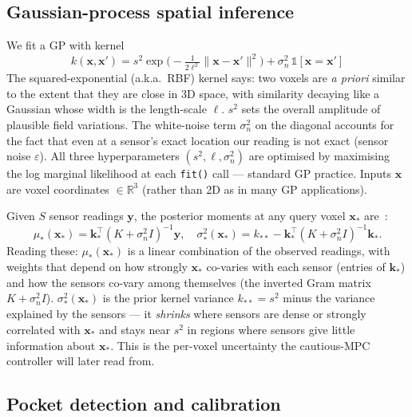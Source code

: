 \documentclass[11pt,letterpaper]{article}
\begin{document}
\subsection{Gaussian-process spatial inference}
\label{sec:gp}

We fit a GP with kernel
\begin{equation}
k(\mathbf{x}, \mathbf{x}') = s^2 \exp\!\Big(-\tfrac{1}{2 \ell^2}
                                            \|\mathbf{x} - \mathbf{x}'\|^2\Big)
                          + \sigma_n^2 \, \mathbb{1}[\mathbf{x} = \mathbf{x}']
\label{eq:kernel}
\end{equation}
The squared-exponential (a.k.a.\ RBF) kernel says: two voxels are
\emph{a priori} similar to the extent that they are close in 3D space,
with similarity decaying like a Gaussian whose width is the length-scale
$\ell$. $s^2$ sets the overall amplitude of plausible field variations.
The white-noise term $\sigma_n^2$ on the diagonal accounts for the fact
that even at a sensor's exact location our reading is not exact (sensor
noise $\varepsilon$). All three hyperparameters
$(s^2, \ell, \sigma_n^2)$ are optimised by maximising the log marginal
likelihood at each \texttt{fit()} call --- standard GP practice. Inputs
$\mathbf{x}$ are voxel coordinates $\in \mathbb{R}^3$ (rather than 2D as
in many GP applications).

Given $S$ sensor readings $\mathbf{y}$, the posterior moments at any
query voxel $\mathbf{x}_*$ are~\citep{rasmussen2006}:
\begin{equation}
\mu_*(\mathbf{x}_*) = \mathbf{k}_*^\top (K + \sigma_n^2 I)^{-1} \mathbf{y},
\quad
\sigma_*^2(\mathbf{x}_*) = k_{**} - \mathbf{k}_*^\top (K + \sigma_n^2 I)^{-1} \mathbf{k}_*.
\label{eq:gppost}
\end{equation}
Reading these: $\mu_*(\mathbf{x}_*)$ is a linear combination of the
observed readings, with weights that depend on how strongly $\mathbf{x}_*$
co-varies with each sensor (entries of $\mathbf{k}_*$) and how the sensors
co-vary among themselves (the inverted Gram matrix $K + \sigma_n^2 I$).
$\sigma_*^2(\mathbf{x}_*)$ is the prior kernel variance $k_{**} = s^2$
minus the variance explained by the sensors --- it \emph{shrinks} where
sensors are dense or strongly correlated with $\mathbf{x}_*$ and stays
near $s^2$ in regions where sensors give little information about
$\mathbf{x}_*$. This is the per-voxel uncertainty the cautious-MPC
controller will later read from.

\subsection{Pocket detection and calibration}
\end{document}
